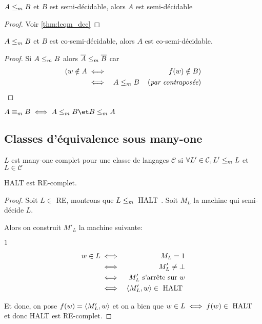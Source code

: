 \begin{theorem}\label{thm:leqm_sdec}
	$A \leq_m B$ et $B$ est semi-décidable, alors $A$ est semi-décidable
\end{theorem}

\begin{proof}
	Voir \ref{thm:leqm_dec}
\end{proof}

\begin{theorem}
	$A \leq_m B$ et $B$ est co-semi-décidable, alors $A$ est co-semi-décidable.
\end{theorem}

\begin{proof}
	Si $A \leq_m B$ alors $\overline A \leq_m \overline B$ car
	\begin{eqnarray*}
		(w \notin A &\iff& f(w) \notin B) \\
		&\iff& A \leq_m B \quad\left(\textit{par contraposée}\right)
	\end{eqnarray*}
\end{proof}

\begin{definition}
	$A \equivm B \iff A \leqm B \et B \leqm A$
\end{definition}

\subsection{Classes d'équivalence sous many-one}

\begin{definition}
	$L$ est many-one complet pour une classe de langages $\mathcal C$ si $\forall L' \in \mathcal C, L' \leq_m L$ et $L \in \mathcal C$
\end{definition}

\begin{prop}
	HALT est RE-complet.
\end{prop}

\begin{proof}
	Soit $L \in $ RE, montrons que $L \leq_m \text{ HALT }$. Soit $M_L$ la machine qui semi-décide $L$.

	Alors on construit $M'_L$ la machine suivante:
	\begin{algorithmic}[lines]
		 {$1$}
		\Else { $\bot$}
		\EndIf
		\EndFunction
	\end{algorithmic}

	\begin{eqnarray*}
		w \in L &\iff& M_L = 1 \\
		&\iff& M'_L \neq \bot \\
		&\iff& M'_L \text{ s'arrête sur } w\\
		&\iff& \left\langle M'_L,w\right\rangle \in \text{ HALT }
	\end{eqnarray*}

	Et donc, on pose $f (w) = \left\langle M'_L,w\right\rangle$ et on a bien que
	$w \in L \iff f(w) \in \text{ HALT }$ et donc HALT est RE-complet.
\end{proof}

